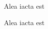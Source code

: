 \vspace*{3cm}

\begin{center}
Alea iacta est
\end{center}

\medskip

\begin{center}
Alea iacta est
\end{center}
